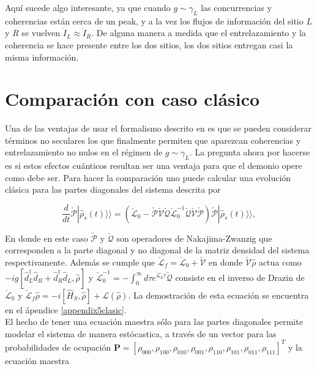 
Aquí sucede algo interesante, ya que cuando $g\sim \gamma_{L}$ las concurrencias y coherencias están cerca de un peak, y a la vez los flujos de información del sitio $L$ y $R$ se vuelven $\dot{I}_{L} \approx \dot{I}_{R}$. De alguna manera a medida que el entrelazamiento y la coherencia se hace presente entre los dos sitios, los dos sitios entregan casi la misma información.


\newpage 

\section{Comparación con caso clásico}
Una de las ventajas de usar el formalismo descrito en \cite{prech2023entanglement} es que se pueden considerar términos no seculares los que finalmente permiten que aparezcan coherencias y entrelazamiento no nulos en el régimen de $g\sim \gamma_{L}$. La pregunta ahora por hacerse es si estos efectos cuánticos resultan ser una ventaja para que el demonio opere como debe ser. Para hacer la comparación uno puede calcular una evolución clásica para las partes diagonales del sistema descrita por

\begin{equation}
    \frac{d}{dt}\check{\mathcal{P}}|\hat{\rho}_{s}(t)\rangle \rangle = (\check{\mathcal{L}}_{0} - \check{\mathcal{P}}\check{\mathcal{V}}\check{\mathcal{Q}}\check{\mathcal{L}}^{-1}_{0}\check{\mathcal{Q}}\check{\mathcal{V}}\check{\mathcal{P}})\check{\mathcal{P}}|\hat{\rho}_{s}(t)\rangle \rangle, 
\label{ec5:classicalmodel}
\end{equation}

En donde en este caso $\check{\mathcal{P}}$ y $\check{\mathcal{Q}}$ son operadores de Nakajima-Zwanzig que corresponden a la parte diagonal y no diagonal de la matriz densidad del sistema respectivamente. Además se cumple que $\check{\mathcal{L}}_{f} = \check{\mathcal{L}}_{0} + \check{\mathcal{V}} $ en donde $\check{\mathcal{V}}\hat{\rho}$ actua como $-ig[\hat{d}_{L}^{\dagger}\hat{d}_{R} + \hat{d}_{R}^{\dagger}\hat{d}_{L},\hat{\rho}]$ y $\check{\mathcal{L}}_{0}^{-1} = - \int_{0}^{\infty}d\tau e^{\check{\mathcal{L}}_{0} \tau} \check{\mathcal{Q}} $ consiste en el inverso de Drazin de $\check{\mathcal{L}}_{0}$ \cite{landi2024current} y $\check{\mathcal{L}}_{f}\hat{\rho} = -i[\hat{H}_{S},\hat{\rho}] + \mathcal{L}(\hat{\rho})$. La demostración de esta ecuación se encuentra en el ápendice \ref{appendix5clasic}. \\
El hecho de tener una ecuación maestra sólo para las partes diagonales permite modelar el sistema de manera estócastica, a través de un vector para las probabilidades de ocupación $\textbf{P} = [\rho_{000},\rho_{100},\rho_{010},\rho_{001},\rho_{110},\rho_{101},\rho_{011},\rho_{111}]^{T}$ y la ecuación maestra


